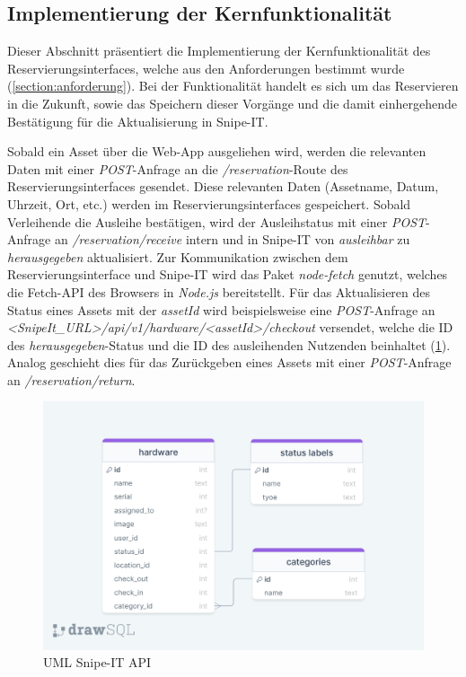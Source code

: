 \subsection{Implementierung der Kernfunktionalität}
  Dieser Abschnitt präsentiert die Implementierung der Kernfunktionalität des
  Reservierungsinterfaces, welche aus den Anforderungen bestimmt wurde (\ref{section:anforderung}).
  Bei der Funktionalität handelt es sich um das Reservieren in die Zukunft, sowie das Speichern
  dieser Vorgänge und die damit einhergehende Bestätigung für die Aktualisierung in Snipe-IT.


 Sobald ein Asset über die Web-App ausgeliehen wird, werden die relevanten Daten mit einer
 \textit{POST}-Anfrage an die \textit{/reservation}-Route des Reservierungsinterfaces gesendet.
 Diese relevanten Daten (Assetname, Datum, Uhrzeit, Ort, etc.) werden im Reservierungsinterfaces
 gespeichert. Sobald Verleihende die Ausleihe bestätigen, wird der Ausleihstatus mit einer
 \textit{POST}-Anfrage an \textit{/reservation/receive} intern und in Snipe-IT von
 \textit{ausleihbar} zu \textit{herausgegeben} aktualisiert. Zur Kommunikation zwischen dem
 Reservierungsinterface und Snipe-IT wird das Paket \textit{node-fetch} genutzt, welches die
 Fetch-API des Browsers in \textit{Node.js} bereitstellt. Für das Aktualisieren des Status eines
 Assets mit der \textit{assetId} wird beispielsweise eine \textit{POST}-Anfrage an
 \textit{<SnipeIt\_URL>/api/v1/hardware/<assetId>/checkout} versendet, welche die ID des
 \textit{herausgegeben}-Status und die ID des ausleihenden Nutzenden beinhaltet (\ref{fig:server}).
 Analog geschieht dies für das Zurückgeben eines Assets mit einer \textit{POST}-Anfrage an
 \textit{/reservation/return}. 

 \begin{figure}[h]
  \centering
  \includegraphics[scale=0.3]{Bilder/apisnipeit.png}
  \caption[UML Snipe-IT API]{UML Snipe-IT API}
  \label{fig:server}
\end{figure}

